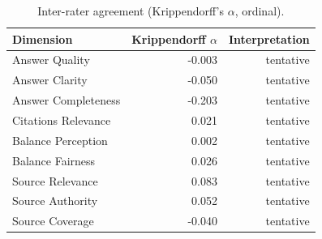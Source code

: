 \begin{table}[htbp]
\centering
\caption{Inter-rater agreement (Krippendorff's $\alpha$, ordinal).}
\label{tab:agreement}
\small
\begin{tabular}{lrr}
\toprule
Dimension & Krippendorff $\alpha$ & Interpretation \\
\midrule
Answer Quality & -0.003 & tentative \\
Answer Clarity & -0.050 & tentative \\
Answer Completeness & -0.203 & tentative \\
Citations Relevance & 0.021 & tentative \\
Balance Perception & 0.002 & tentative \\
Balance Fairness & 0.026 & tentative \\
Source Relevance & 0.083 & tentative \\
Source Authority & 0.052 & tentative \\
Source Coverage & -0.040 & tentative \\
\bottomrule
\end{tabular}
\end{table}